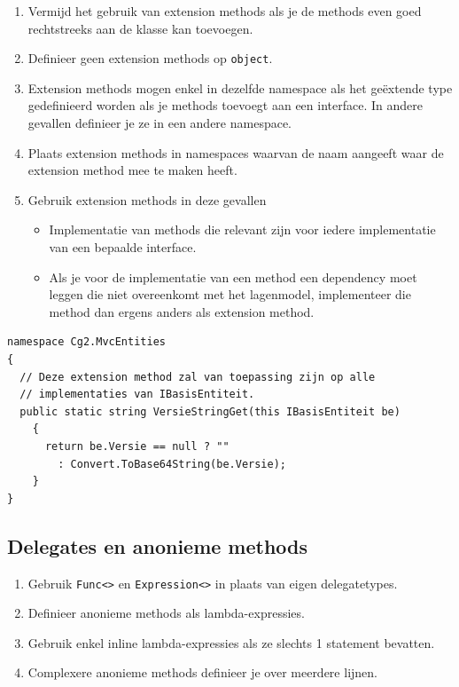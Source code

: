 \documentclass[a4paper,11pt]{article}
\begin{document}
\begin{enumerate}[resume]
\item Vermijd het gebruik van extension methods als je de methods even goed rechtstreeks aan de klasse kan toevoegen.
\item Definieer geen extension methods op \lstinline !object!.
\item Extension methods mogen enkel in dezelfde namespace als het
ge\"extende type gedefinieerd worden als je methods toevoegt aan een
interface.  In andere gevallen definieer je ze in een andere namespace.
\item Plaats extension methods in namespaces waarvan de naam aangeeft waar
de extension method mee te maken heeft.
\item Gebruik extension methods in deze gevallen
\begin{itemize}
\item Implementatie van methods die relevant zijn voor iedere
implementatie van een bepaalde interface.
\item Als je voor de implementatie van een method een dependency moet
leggen die niet overeenkomt met het lagenmodel, implementeer die method
dan ergens anders als extension method.
\end{itemize}
\end{enumerate}

\begin{lstlisting}[float,caption=Extension methods]
namespace Cg2.MvcEntities
{
  // Deze extension method zal van toepassing zijn op alle 
  // implementaties van IBasisEntiteit.
  public static string VersieStringGet(this IBasisEntiteit be)
    {
      return be.Versie == null ? "" 
        : Convert.ToBase64String(be.Versie);
    }	
}
\end{lstlisting}

\subsection{Delegates en anonieme methods}

\begin{enumerate}[resume]
\item Gebruik \lstinline !Func<>! en \lstinline !Expression<>! in plaats van eigen delegatetypes.
\item Definieer anonieme methods als lambda-expressies.
\item Gebruik enkel inline lambda-expressies als ze slechts 1 statement bevatten.
\item Complexere anonieme methods definieer je over meerdere lijnen.
\end{enumerate}
\end{document}
